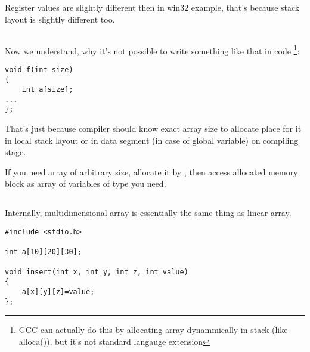 {Register values are slightly different then in win32 example, 
that's because stack layout is slightly different too.}

\subsection{}

{Now we understand, why it's not possible to write something like that in \CCpp code
\footnote{GCC can actually do this by allocating array dynammically in stack (like alloca()), 
but it's not standard langauge extension}:}

\begin{lstlisting}
void f(int size)
{
    int a[size];
...
};
\end{lstlisting}

{That's just because compiler should know exact array size to allocate place for it in local stack layout or
in data segment (in case of global variable) on compiling stage.}

{If you need array of arbitrary size, allocate it by , then access allocated memory block
as array of variables of type you need.}

\subsection{}

{Internally, multidimensional array is essentially the same thing as linear array.}


\begin{lstlisting}
#include <stdio.h>

int a[10][20][30];

void insert(int x, int y, int z, int value)
{
	a[x][y][z]=value;
};
\end{lstlisting}

